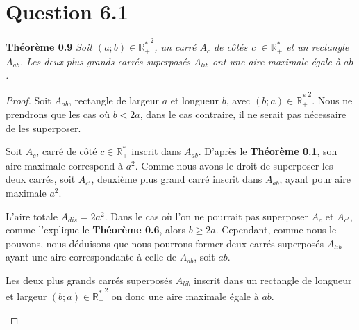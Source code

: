 \documentclass[]{amsart}
\theoremstyle{definition}
\theoremstyle{remark}
\numberwithin{equation}{section}
\begin{document}
\section*{Question 6.1}

\textbf{Théorème 0.9} \emph{Soit $(a;b) \in \mathbb{R_{+}^{\ast}}^2$, un carré $A_c$ de côtés c $\in \mathbb{R_{+}^{\ast}}$ et un rectangle $A_{ab}$. Les deux plus grands carrés superposés $A_{lib}$ ont une aire maximale égale à $ab$.} 

\begin{proof}
Soit $A_{ab}$, rectangle de largeur $a$ et longueur $b$, avec $ (b;a) \in \mathbb{R_{+}^{\ast}}^2$. Nous ne prendrons que les cas où $b<2a$, dans le cas contraire, il ne serait pas nécessaire de les superposer.

Soit $A_c$, carré de côté $c \in \mathbb{R_{+}^{\ast}}$ inscrit dans $A_{ab}$. D'après le \textbf{Théorème 0.1}, son aire maximale correspond à $a^2$. Comme nous avons le droit de superposer les deux carrés, soit $A_{c'}$, deuxième plus grand carré inscrit dans $A_{ab}$, ayant pour aire maximale $a^2$.

L'aire totale $A_{dis} = 2a^2$. Dans le cas où l'on ne pourrait pas superposer $A_c$ et $A_{c'}$, comme l'explique le \textbf{Théorème 0.6}, alors $b \geq 2a$. Cependant, comme nous le pouvons, nous déduisons que nous pourrons former deux carrés superposés $A_{lib}$ ayant une aire correspondante à celle de $A_{ab}$, soit $ab$.\newline

Les deux plus grands carrés superposés $A_{lib}$ inscrit dans un rectangle de longueur et largeur $(b;a)\in \mathbb{R_{+}^{\ast}}^2$ on donc une aire maximale égale à $ab$.

\begin{center}
\end{center}

\end{proof}
\end{document}
